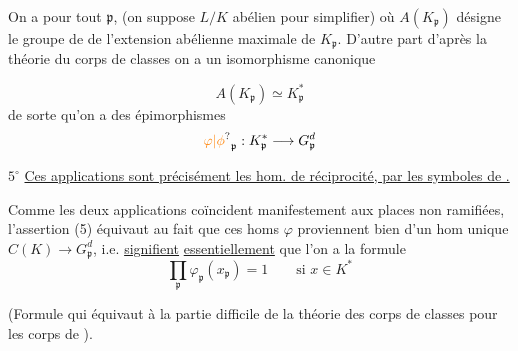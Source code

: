 On a pour tout $\mathfrak p$, 
(on suppose $L/K$ abélien pour simplifier) où $A(K_{\mathfrak p})$ désigne le groupe de  de l'extension abélienne maximale de $K_{\mathfrak p}$. D'autre part d'après la théorie du corps de classes  on a un isomorphisme canonique

\[
A(K_{\mathfrak p})\simeq K_{\mathfrak p}^*
\]
de sorte qu'on a des épimorphismes
\[
{\unsure{\varphi|\phi}}_{\mathfrak p}:K_{\mathfrak p}^*\longrightarrow G_{\mathfrak p}^{d}
\]

\textcircled{$5^\circ$} \uline{Ces applications sont précisément les hom. de réciprocité,  par les symboles de   .}

Comme les deux applications coïncident manifestement aux places non ramifiées, l'assertion (5) équivaut au fait que ces homs $\varphi$  proviennent bien d'un hom unique $C(K)\longrightarrow G_{\mathfrak p}^{d}$, i.e.  \uline{signifient} \uline{essentiellement} que l'on a la formule
\[
\boxed{\prod_{\mathfrak p}\varphi_{\mathfrak p}(x_{\mathfrak p})=1\qquad\text{si }x\in K^*}
\]

(Formule qui  équivaut à la partie difficile de la théorie  des corps de classes pour les corps de ).


